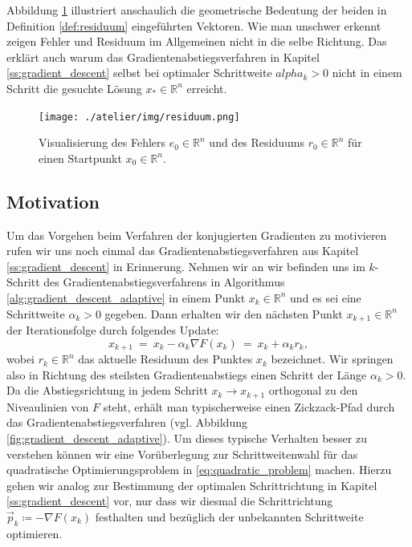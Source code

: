 Abbildung \ref{fig:residuum} illustriert anschaulich die geometrische Bedeutung der beiden in Definition \ref{def:residuum} eingeführten Vektoren.
Wie man unschwer erkennt zeigen Fehler und Residuum im Allgemeinen nicht in die selbe Richtung.
Das erklärt auch warum das Gradientenabstiegsverfahren in Kapitel \ref{ss:gradient_descent} selbst bei optimaler Schrittweite $alpha_k > 0$ nicht in einem Schritt die gesuchte Lösung $x_* \in \mathbb{R}^n$ erreicht.
\begin{figure}
\centering
\texttt{[image: ./atelier/img/residuum.png]}
\caption{Visualisierung des Fehlers $e_0 \in \mathbb{R}^n$ und des Residuums $r_0 \in \mathbb{R}^n$ für einen Startpunkt $x_0 \in \mathbb{R}^n$.}
\label{fig:residuum}
\end{figure}

\subsection{Motivation}
\label{ss:motivation}
Um das Vorgehen beim Verfahren der konjugierten Gradienten zu motivieren rufen wir uns noch einmal das Gradientenabstiegsverfahren aus Kapitel \ref{ss:gradient_descent} in Erinnerung.
Nehmen wir an wir befinden uns im $k$-Schritt des Gradientenabstiegsverfahrens in Algorithmus \ref{alg:gradient_descent_adaptive} in einem Punkt $x_k \in \mathbb{R}^n$ und es sei eine Schrittweite $\alpha_k > 0$ gegeben.
Dann erhalten wir den nächsten Punkt $x_{k+1} \in \mathbb{R}^n$ der Iterationsfolge durch folgendes Update:
\begin{equation*}
x_{k+1} \ = \ x_k - \alpha_k \nabla F(x_k) \ = \ x_k + \alpha_k r_k,
\end{equation*}
wobei $r_k \in \mathbb{R}^n$ das aktuelle Residuum des Punktes $x_k$ bezeichnet.
Wir springen also in Richtung des steilsten Gradientenabstiegs einen Schritt der Länge $\alpha_k > 0$.
Da die Abstiegsrichtung in jedem Schritt $x_k \rightarrow x_{k+1}$ orthogonal zu den Niveaulinien von $F$ steht, erhält man typischerweise einen Zickzack-Pfad durch das Gradientenabstiegsverfahren (vgl. Abbildung \ref{fig:gradient_descent_adaptive}).
Um dieses typische Verhalten besser zu verstehen können wir eine Vorüberlegung zur Schrittweitenwahl für das quadratische Optimierungsproblem in \eqref{eq:quadratic_problem} machen.
Hierzu gehen wir analog zur Bestimmung der optimalen Schrittrichtung in Kapitel \ref{ss:gradient_descent} vor, nur dass wir diesmal die Schrittrichtung $\vec{p}_k \coloneqq -\nabla F(x_k)$ festhalten und bezüglich der unbekannten Schrittweite optimieren.
